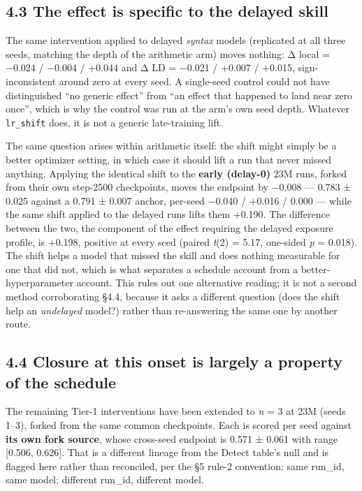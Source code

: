 \documentclass[11pt]{article}
\begin{document}
\subsection{4.3 The effect is specific to the delayed skill}\label{the-effect-is-specific-to-the-delayed-skill}

The same intervention applied to delayed \emph{syntax} models (replicated at all three seeds,
matching the depth of the arithmetic arm) moves nothing: Δ local = −0.024 / −0.004 /
+0.044 and Δ LD = −0.021 / +0.007 / +0.015, sign-inconsistent around zero at every seed.
A single-seed control could not have distinguished ``no generic effect'' from ``an effect that
happened to land near zero once'', which is why the control was run at the arm's own seed
depth. Whatever \texttt{lr\_shift} does, it is not a generic late-training lift.

The same question arises within arithmetic itself: the shift might simply be a better
optimizer setting, in which case it should lift a run that never missed anything. Applying
the identical shift to the \textbf{early (delay-0)} 23M runs, forked from their own step-2500
checkpoints, moves the endpoint by −0.008 --- 0.783 ± 0.025 against a 0.791 ± 0.007 anchor,
per-seed −0.040 / +0.016 / 0.000 --- while the same shift applied to the delayed runs lifts
them +0.190. The difference between the two, the component of the effect requiring the
delayed exposure profile, is +0.198, positive at every seed (paired \emph{t}(2) = 5.17, one-sided
\emph{p} = 0.018). The shift helps a model that missed the skill and does nothing measurable for
one that did not, which is what separates a schedule account from a better-hyperparameter
account. This rules out one alternative reading; it is not a second method corroborating
§4.4, because it asks a different question (does the shift help an \emph{undelayed} model?) rather
than re-answering the same one by another route.

\subsection{4.4 Closure at this onset is largely a property of the schedule}\label{closure-at-this-onset-is-largely-a-property-of-the-schedule}

The remaining Tier-1 interventions have been extended to \emph{n} = 3 at 23M (seeds 1--3), forked
from the same common checkpoints. Each is scored per seed against \textbf{its own fork source},
whose cross-seed endpoint is 0.571 ± 0.061 with range {[}0.506, 0.626{]}. That is a different
lineage from the Detect table's null and is flagged here rather than reconciled, per the §5
rule-2 convention: same run\_id, same model; different run\_id, different model.
\end{document}
